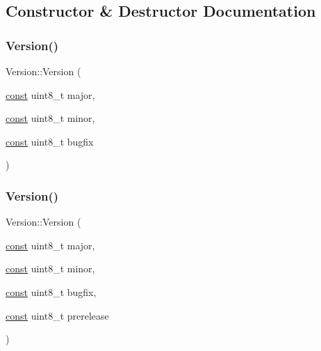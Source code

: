 \subsection{Constructor \& Destructor Documentation}
\mbox{\label{classlucene_1_1core_1_1util_1_1Version_aab6be2fea4aac2881ae89ce58de8adcf}} 
\subsubsection{\texorpdfstring{Version()}{Version()}\hspace{0.1cm}{\footnotesize\ttfamily [1/4]}}
{\footnotesize\ttfamily Version\+::\+Version (\begin{DoxyParamCaption}\item[{\mbox{\hyperlink{ZlibCrc32_8h_a2c212835823e3c54a8ab6d95c652660e}{const}} uint8\+\_\+t}]{major,  }\item[{\mbox{\hyperlink{ZlibCrc32_8h_a2c212835823e3c54a8ab6d95c652660e}{const}} uint8\+\_\+t}]{minor,  }\item[{\mbox{\hyperlink{ZlibCrc32_8h_a2c212835823e3c54a8ab6d95c652660e}{const}} uint8\+\_\+t}]{bugfix }\end{DoxyParamCaption})\hspace{0.3cm}{\ttfamily [private]}}

\mbox{\label{classlucene_1_1core_1_1util_1_1Version_a66271931b8d12d78ca35ec79a559a86e}} 
\subsubsection{\texorpdfstring{Version()}{Version()}\hspace{0.1cm}{\footnotesize\ttfamily [2/4]}}
{\footnotesize\ttfamily Version\+::\+Version (\begin{DoxyParamCaption}\item[{\mbox{\hyperlink{ZlibCrc32_8h_a2c212835823e3c54a8ab6d95c652660e}{const}} uint8\+\_\+t}]{major,  }\item[{\mbox{\hyperlink{ZlibCrc32_8h_a2c212835823e3c54a8ab6d95c652660e}{const}} uint8\+\_\+t}]{minor,  }\item[{\mbox{\hyperlink{ZlibCrc32_8h_a2c212835823e3c54a8ab6d95c652660e}{const}} uint8\+\_\+t}]{bugfix,  }\item[{\mbox{\hyperlink{ZlibCrc32_8h_a2c212835823e3c54a8ab6d95c652660e}{const}} uint8\+\_\+t}]{prerelease }\end{DoxyParamCaption})\hspace{0.3cm}{\ttfamily [private]}}

